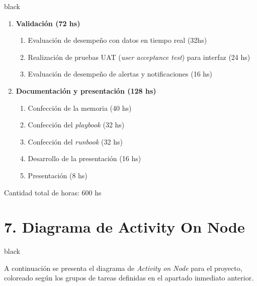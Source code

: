 \documentclass[11pt]{charter}
\begin{document}
\begin{consigna}{black}
\begin{enumerate}
\item \textbf{Validación (72 hs)}
	\begin{enumerate}
	\item Evaluación de desempeño con datos en tiempo real (32hs)
	\item Realización de pruebas UAT (\textit{user acceptance test}) para interfaz (24 hs)
	\item Evaluación de desempeño de alertas y notificaciones (16 hs)
	\end{enumerate}

\item \textbf{Documentación y presentación (128 hs)}
	\begin{enumerate}
	\item Confección de la memoria (40 hs)
	\item Confección del \textit{playbook} (32 hs)
	\item Confección del \textit{runbook} (32 hs)
	\item Desarrollo de la presentación (16 hs)
	\item Presentación (8 hs)
	\end{enumerate}
\end{enumerate}

Cantidad total de horas: 600 hs

\end{consigna}

\section{7. Diagrama de Activity On Node}
\label{sec:AoN}
\begin{consigna}{black}

A continuación se presenta el diagrama de \textit{Activity on Node} para el proyecto, coloreado según los grupos de tareas definidas en el apartado inmediato anterior. 
\end{consigna}
\end{document}
